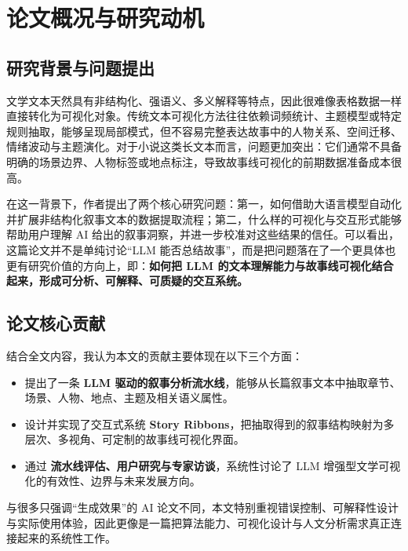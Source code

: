 \documentclass[a4paper,12pt,UTF8]{article}
\begin{document}

\section{论文概况与研究动机}

\subsection{研究背景与问题提出}
文学文本天然具有非结构化、强语义、多义解释等特点，因此很难像表格数据一样直接转化为可视化对象。传统文本可视化方法往往依赖词频统计、主题模型或特定规则抽取，能够呈现局部模式，但不容易完整表达故事中的人物关系、空间迁移、情绪波动与主题演化。对于小说这类长文本而言，问题更加突出：它们通常不具备明确的场景边界、人物标签或地点标注，导致故事线可视化的前期数据准备成本很高。

在这一背景下，作者提出了两个核心研究问题：第一，如何借助大语言模型自动化并扩展非结构化叙事文本的数据提取流程；第二，什么样的可视化与交互形式能够帮助用户理解 AI 给出的叙事洞察，并进一步校准对这些结果的信任。可以看出，这篇论文并不是单纯讨论“LLM 能否总结故事”，而是把问题落在了一个更具体也更有研究价值的方向上，即：\textbf{如何把 LLM 的文本理解能力与故事线可视化结合起来，形成可分析、可解释、可质疑的交互系统。}

\subsection{论文核心贡献}
结合全文内容，我认为本文的贡献主要体现在以下三个方面：

\begin{itemize}
    \item 提出了一条 \textbf{LLM 驱动的叙事分析流水线}，能够从长篇叙事文本中抽取章节、场景、人物、地点、主题及相关语义属性。
    \item 设计并实现了交互式系统 \textbf{Story Ribbons}，把抽取得到的叙事结构映射为多层次、多视角、可定制的故事线可视化界面。
    \item 通过 \textbf{流水线评估、用户研究与专家访谈}，系统性讨论了 LLM 增强型文学可视化的有效性、边界与未来发展方向\cite{storyribbons2026}。
\end{itemize}

与很多只强调“生成效果”的 AI 论文不同，本文特别重视错误控制、可解释性设计与实际使用体验，因此更像是一篇把算法能力、可视化设计与人文分析需求真正连接起来的系统性工作。
\end{document}
